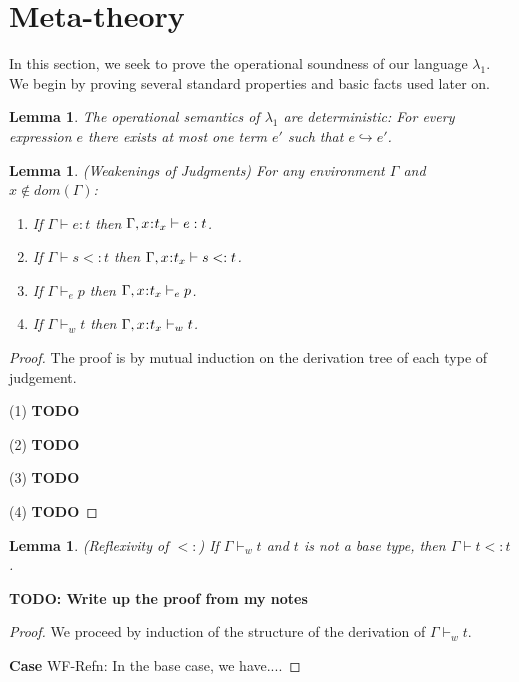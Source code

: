 \documentclass[11pt]{article}
\newtheorem{lemma}[theorem]{Lemma}
\newcommand{\bind}{\hspace{0.05em}{:}\hspace{0.05em}} %
\newcommand{\step}{\hookrightarrow}
\begin{document}
\section{Meta-theory}  %

In this section, we seek to prove the operational soundness of our language $\lambda_1$. We begin by proving several standard properties and basic facts used later on.

\begin{lemma}\label{step-determ}
The operational semantics of $\lambda_1$ are deterministic: For every expression $e$ there exists at most one term $e'$ such that $e \step e'$.
\end{lemma}

\begin{lemma}\label{weakenings}
(Weakenings of Judgments) For any environment $\Gamma$ and $x \not\in dom(\Gamma)$:
\begin{enumerate}
\item If $\Gamma \vdash e : t$ then $\Gamma, x\bind t_x \vdash e :  t$.
\item If $\Gamma \vdash s <: t$ then $\Gamma, x\bind t_x \vdash s <: t$.
\item If $\Gamma \vdash_e p$ then $\Gamma, x\bind t_x \vdash_e p$.
\item If $\Gamma \vdash_w t$ then $\Gamma, x\bind t_x \vdash_w t$.
\end{enumerate}
\end{lemma}
\begin{proof}
The proof is by mutual induction on the derivation tree of each type of judgement.

(1) {\bf TODO}

(2) {\bf TODO}

(3) {\bf TODO}

(4) {\bf TODO}
\end{proof}


\begin{lemma}\label{sub-refl}
(Reflexivity of $<:$) If $\Gamma \vdash_w t$ and $t$ is not a base type, then $\Gamma \vdash t <: t$.
\end{lemma} {\bf TODO: Write up the proof from my notes}

\begin{proof} We proceed by induction of the structure of the derivation of $\Gamma \vdash_w t$.

{\bf Case} {\sc WF-Refn}: In the base case, we have....
	
\end{proof}
\end{document}
